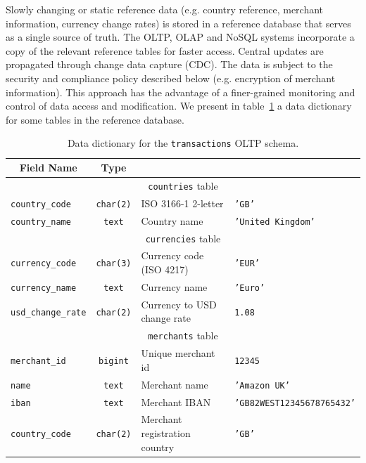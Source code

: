 \documentclass[11pt,a4paper,computermodern]{article}
\newcommand{\code}{\texttt}
\begin{document}
Slowly changing or static reference data (e.g. country reference, merchant information, currency change rates) is stored in a reference database that serves as a single source of truth. The OLTP, OLAP and NoSQL systems incorporate a copy of the relevant reference tables for faster access. Central updates are propagated through change data capture (CDC). The data is subject to the security and compliance policy described below (e.g. encryption of merchant information). This approach has the advantage of a finer-grained monitoring and control of data access and modification. We present in table~\ref{table:ReferenceDataDict} a data dictionary for some tables in the reference database.

\begin{table}[!htb]
	\centering
	\begin{threeparttable}
		\caption{Data dictionary for the \code{transactions} OLTP schema.}
		\label{table:ReferenceDataDict}
		\begin{tabularx}{0.99\textwidth}{l c >{\arraybackslash}X >{\arraybackslash}X}
			\toprule
			\multicolumn{1}{c}{\textbf{Field Name}} & \multicolumn{1}{c}{\textbf{Type}} & \multicolumn{1}{c}{\textbf{Description}} & \multicolumn{1}{c}{\textbf{Example}} \\
			\midrule
			\multicolumn{4}{c}{\code{countries} table}\\
			\code{country\_code} & \code{char(2)} & ISO 3166-1 2-letter & \code{'GB'} \\
			\code{country\_name} & \code{text} & Country name & \code{'United Kingdom'} \\
			
			\midrule
			\multicolumn{4}{c}{\code{currencies} table}\\
			\code{currency\_code} & \code{char(3)} & Currency code (ISO 4217) & \code{'EUR'} \\
			\code{currency\_name} & \code{text} & Currency name & \code{'Euro'} \\
			\code{usd\_change\_rate} & \code{char(2)} & Currency to USD change rate & \code{1.08} \\
			
			\midrule
			\multicolumn{4}{c}{\code{merchants} table}\\
			\code{merchant\_id} & \code{bigint} & Unique merchant id & \code{12345} \\
			\code{name} & \code{text} & Merchant name & \code{'Amazon UK'} \\
			\code{iban} & \code{text} & Merchant IBAN & \code{'GB82WEST12345678765432'} \\
			\code{country\_code} & \code{char(2)} & Merchant registration country & \code{'GB'} \\
			

\end{tabularx}
\end{threeparttable}
\end{table}
\end{document}
